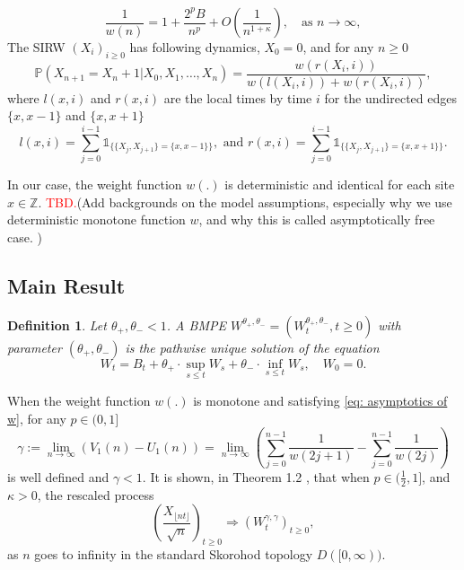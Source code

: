 \documentclass[twoside,12pt,a4paper]{article}
\newtheorem{definition}{Definition}[section]
\numberwithin{equation}{section}
\newcommand\TBD{\textcolor{red}{TBD.}}
\begin{document}
	
	\begin{equation}\label{eq: asymptotics of w}
		\frac{1}{w(n)} = 1+\frac{2^p B}{n^p} + O\left(\frac{1}{n^{1+\mathcal{\kappa}}}\right), \quad \mbox{as $n\to \infty$}, 	
	\end{equation} 
	The SIRW $(X_i)_{i\geq 0}$ has following dynamics, 
	$X_0 = 0$, and for any $n\geq 0$
	\begin{equation}\label{dynamic}
		\mathbb{P}\left( X_{n+1} =  X_n +1 | X_0,X_1,\dots,X_n   \right) =  \frac{  w(r(X_i,i) )}{ w(l(X_i,i))  + w(r(X_i,i))   },
	\end{equation}
	where $l(x,i)$ and $r(x,i)$ are the local times by time $i$ for the undirected edges $\{x,x-1\}$ and $\{x,x+1\}$
	$$ l(x,i) = \sum_{j=0}^{i-1} \mathbb{1}_{ \{  \{X_j, X_{j+1}\} =  \{x,x-1\} \} }, \mbox{ and }  r(x,i) = \sum_{j=0}^{i-1} \mathbb{1}_{ \{  \{X_j, X_{j+1}\} =  \{x,x+1\} \} }.        $$
	
	In our case, the weight function $w(.)$ is deterministic and identical for each site $x\in \mathbb{Z}$. \TBD (Add backgrounds on the model assumptions, especially why we use deterministic monotone function $w$, and why this is called asymptotically free case. )
	
	\subsection{Main Result}
	\begin{definition}
		Let $\theta_+, \theta_- <1$. A BMPE $W^{\theta_+, \theta_-} = \left(W^{\theta_+, \theta_-}_t, t\geq 0\right)$ with parameter  $(\theta_+, \theta_-)$ is the pathwise unique solution of the equation
		$$
		W_t = B_t + \theta_+ \cdot \sup_{s\leq t} W_s  + \theta_- \cdot \inf_{s\leq t} W_s,   \quad W_0 = 0.
		$$
	\end{definition}
	When the weight function $w(.)$ is monotone and satisfying \eqref{eq: asymptotics of w}, for any $p\in (0,1]$
	\begin{equation}\label{eq: gamma}
		\gamma:= \lim_{n\to \infty}\left( V_1(n) - U_1(n) \right) =\lim_{n\to \infty} \left( \sum_{j=0}^{n-1} \frac{1}{ w(2j+1)}-  \sum_{j=0}^{n-1}  \frac{1}{w(2j)} \right) 
	\end{equation}
	is well defined and $\gamma<1$. It is shown, in Theorem 1.2 \cite{KMP22}, that when $p\in (\frac{1}{2},1]$, and $\kappa >0 $, the rescaled process
	$$
	\left(  \frac{X_{\lfloor nt \rfloor }}{\sqrt{n}}  \right)_{t\geq 0} \Longrightarrow \left( W^{\gamma,\gamma}_{t}\right)_{t\geq 0},
	$$ as $n$ goes to infinity in the standard Skorohod topology $D([0,\infty) ).$
	
\end{document}
